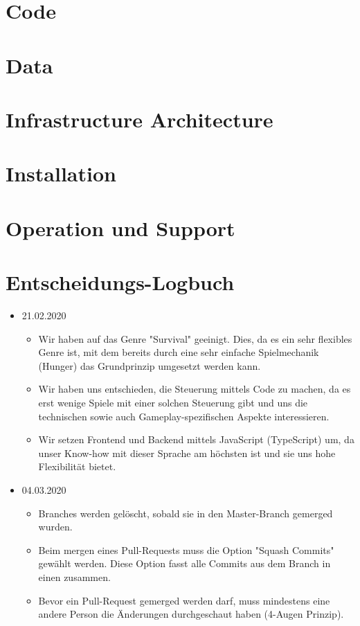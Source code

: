 \documentclass[a4paper, 11pt]{scrartcl}
\let\oldsection\section
\renewcommand\section{\clearpage\oldsection}
\begin{document}
\section{Code}

\section{Data}

\section{Infrastructure Architecture}

\section{Installation}

\section{Operation und Support}

\section{Entscheidungs-Logbuch}

\begin{itemize}
\item 21.02.2020
\begin{itemize}
\item Wir haben auf das Genre "Survival" geeinigt. Dies, da es ein sehr flexibles Genre ist, mit dem bereits durch eine sehr einfache Spielmechanik (Hunger) das Grundprinzip umgesetzt werden kann.
\item Wir haben uns entschieden, die Steuerung mittels Code zu machen, da es erst wenige Spiele mit einer solchen Steuerung gibt und uns die technischen sowie auch Gameplay-spezifischen Aspekte interessieren.
\item Wir setzen Frontend und Backend mittels JavaScript (TypeScript) um, da unser Know-how mit dieser Sprache am höchsten ist und sie uns hohe Flexibilität bietet.
\end{itemize}
\item 04.03.2020
\begin{itemize}
\item Branches werden gelöscht, sobald sie in den Master-Branch gemerged wurden.
\item Beim mergen eines Pull-Requests muss die Option "Squash Commits" gewählt werden. Diese Option fasst alle Commits aus dem Branch in einen zusammen. 
\item Bevor ein Pull-Request gemerged werden darf, muss mindestens eine andere Person die Änderungen durchgeschaut haben (4-Augen Prinzip).
\end{itemize}
\end{itemize}

\clearpage

\printglossary[type=\acronymtype]

\printglossary
\end{document}
